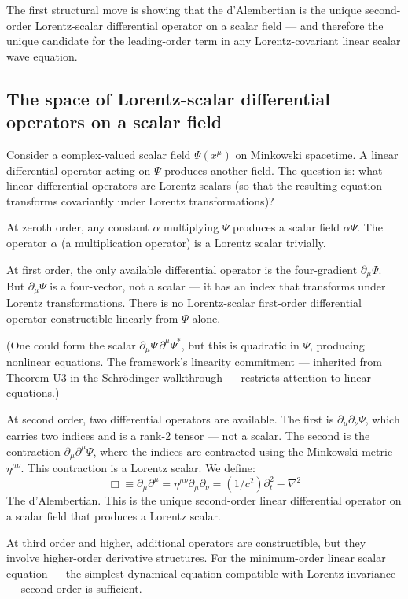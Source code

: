 \documentclass[11pt,a4paper]{article}
\begin{document}
The first structural move is showing that the d'Alembertian is the unique second-order Lorentz-scalar differential operator on a scalar field --- and therefore the unique candidate for the leading-order term in any Lorentz-covariant linear scalar wave equation.

\subsection{The space of Lorentz-scalar differential operators on a scalar field}

Consider a complex-valued scalar field $\Psi(x^\mu)$ on Minkowski spacetime. A linear differential operator acting on $\Psi$ produces another field. The question is: what linear differential operators are Lorentz scalars (so that the resulting equation transforms covariantly under Lorentz transformations)?

At zeroth order, any constant $\alpha$ multiplying $\Psi$ produces a scalar field $\alpha\Psi$. The operator $\alpha$ (a multiplication operator) is a Lorentz scalar trivially.

At first order, the only available differential operator is the four-gradient $\partial_\mu\Psi$. But $\partial_\mu\Psi$ is a four-vector, not a scalar --- it has an index that transforms under Lorentz transformations. There is no Lorentz-scalar first-order differential operator constructible linearly from $\Psi$ alone.

(One could form the scalar $\partial_\mu\Psi\, \partial^\mu\Psi^*$, but this is quadratic in $\Psi$, producing nonlinear equations. The framework's linearity commitment --- inherited from Theorem U3 in the Schr\"odinger walkthrough --- restricts attention to linear equations.)

At second order, two differential operators are available. The first is $\partial_\mu\partial_\nu\Psi$, which carries two indices and is a rank-2 tensor --- not a scalar. The second is the contraction $\partial_\mu\partial^\mu\Psi$, where the indices are contracted using the Minkowski metric $\eta^{\mu\nu}$. This contraction is a Lorentz scalar. We define:
\[
\Box \equiv \partial_\mu\partial^\mu = \eta^{\mu\nu}\partial_\mu\partial_\nu = (1/c^{2})\partial_t^{2} - \nabla^{2}
\]
The d'Alembertian. This is the unique second-order linear differential operator on a scalar field that produces a Lorentz scalar.

At third order and higher, additional operators are constructible, but they involve higher-order derivative structures. For the minimum-order linear scalar equation --- the simplest dynamical equation compatible with Lorentz invariance --- second order is sufficient.
\end{document}
